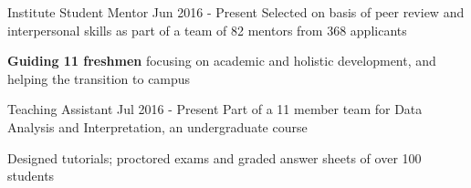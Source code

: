\begin{cventries}
\cvpor
{Institute Student Mentor} %
{Jun 2016 - Present} %
{Selected on basis of peer review and interpersonal skills as part of a team of 82 mentors from 368 applicants}
{ %
\begin{cvitems}
\item {\textbf{Guiding 11 freshmen} focusing on academic and holistic development, and helping the transition to campus}
\end{cvitems}
}
\cvpor
{Teaching Assistant} %
{Jul 2016 - Present} %
{Part of a 11 member team for Data Analysis and Interpretation, an undergraduate course}
{ %
\begin{cvitems}
\item {Designed tutorials; proctored exams and graded answer sheets of over 100 students}
\end{cvitems}
}
\end{cventries}